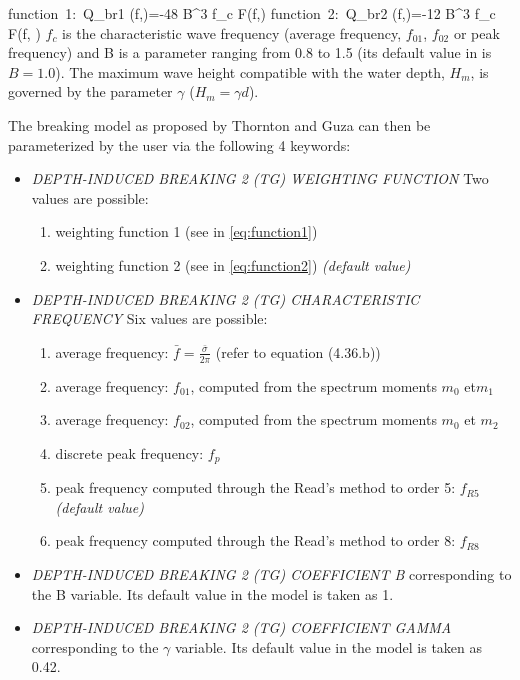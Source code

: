 \bequ
\label{eq:function1} 
\mbox{function 1: }Q_{br1} \left(f,\theta \right)=-48\sqrt{\pi } B^{3} f_c
 \; F\left(f,\theta \right)
\earr
\eequ
\bequ
{}
\label{eq:function2} 
\mbox{function 2: }Q_{br2} \left(f,\theta \right)=-12\sqrt{\pi } B^3 f_c
 \; F\left(f,\theta
\right)
\earr
\eequ 
$f_c $ is the characteristic wave frequency (average frequency, $f_{01}$,
$f_{02}$ or peak frequency) and B is a parameter ranging from 0.8 to 1.5 (its
default value in \tomawac is $B=1.0$). The maximum wave height compatible with
the water depth, $H_m$, is governed by the parameter $\gamma$ ($H_m =\gamma d$).

The breaking model as proposed by Thornton and Guza can then be parameterized
by the user via the following 4 keywords:

 \begin{itemize}
 \item \textit{DEPTH-INDUCED BREAKING 2 (TG) WEIGHTING FUNCTION} Two values are
   possible:
 \begin{enumerate}
 \item weighting function 1 (see in \ref{eq:function1})
 \item weighting function 2 (see in \ref{eq:function2})\textit{ (default value)}
\end{enumerate}
 \item \textit{DEPTH-INDUCED BREAKING 2 (TG) CHARACTERISTIC FREQUENCY} Six values are possible:
 \begin{enumerate}
 \item average frequency: $\bar{f}=\frac{\bar{\sigma }}{2\pi } $  (refer to equation (4.36.b))
 \item average frequency: $f_{01} $, computed from the spectrum moments $m_0$ et$ m_1$
 \item average frequency: $f_{02} $, computed from the spectrum moments $m_0$ et $m_2$
 \item discrete peak frequency: $f_p$
 \item peak frequency computed through the Read's method to order 5: $f_{R5}$ \textit{(default value)}
 \item peak frequency computed through the Read's method to order 8: $f_{R8}$
\end{enumerate}
\item \textit{ DEPTH-INDUCED BREAKING 2 (TG) COEFFICIENT B} corresponding to
  the B variable. Its default value in the model is taken as 1.
\item \textit{DEPTH-INDUCED BREAKING 2 (TG) COEFFICIENT GAMMA} corresponding
  to the $\gamma$ variable. Its default value in the model is taken as 0.42.
\end{itemize}


